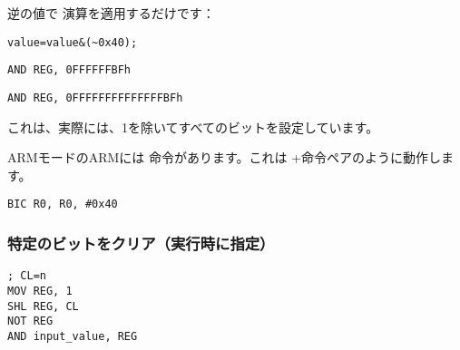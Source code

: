 逆の値で \AND 演算を適用するだけです：

\begin{lstlisting}[caption=\CCpp,style=customc]
value=value&(~0x40);
\end{lstlisting}

\begin{lstlisting}[caption=x86,style=customasmx86]
AND REG, 0FFFFFFBFh
\end{lstlisting}

\begin{lstlisting}[caption=x64,style=customasmx86]
AND REG, 0FFFFFFFFFFFFFFBFh
\end{lstlisting}

これは、実際には、1を除いてすべてのビットを設定しています。


ARMモードのARMには \BIC 命令があります。これは \NOT+\AND 命令ペアのように動作します。

\begin{lstlisting}[caption=ARM (\ARMMode),style=customasmARM]
BIC R0, R0, #0x40
\end{lstlisting}

\subsubsection{
特定のビットをクリア（実行時に指定）}



\begin{lstlisting}[caption=x86,style=customasmx86]
; CL=n
MOV REG, 1
SHL REG, CL
NOT REG
AND input_value, REG
\end{lstlisting}
